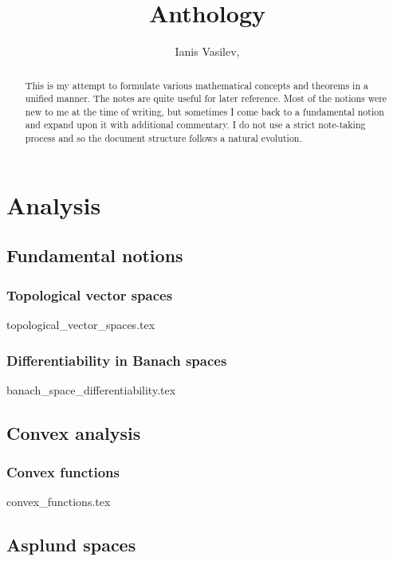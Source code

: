 \documentclass[numbers=endperiod, bibliography=totocnumbered]{scrartcl}
\title{Anthology}
\author{Ianis Vasilev, \Email{ianis@ivasilev.net}}
\date{}
\begin{document}
\maketitle

\begin{abstract}
  This is my attempt to formulate various mathematical concepts and theorems in a unified manner. The notes are quite useful for later reference. Most of the notions were new to me at the time of writing, but sometimes I come back to a fundamental notion and expand upon it with additional commentary. I do not use a strict note-taking process and so the document structure follows a natural evolution.
\end{abstract}

\tableofcontents

\section{Analysis}\label{sec:analysis}
\subsection{Fundamental notions}\label{sec:analysis/fundamental_notions}
\subsubsection{Topological vector spaces}\label{sec:topological_vector_spaces}
{topological_vector_spaces.tex}
\subsubsection{Differentiability in Banach spaces}\label{sec:banach_space_differentiability}
{banach_space_differentiability.tex}

\subsection{Convex analysis}\label{sec:convex_analysis}
\subsubsection{Convex functions}\label{sec:convex_functions}
{convex_functions.tex}

\subsection{Asplund spaces}\label{sec:asplund_spaces}
\end{document}
